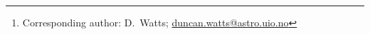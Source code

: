 \author{
D.~J.~Watts\thanks{Corresponding author: D.~Watts; \url{duncan.watts@astro.uio.no}}
\and
A.~I.~S.~Martins
}
